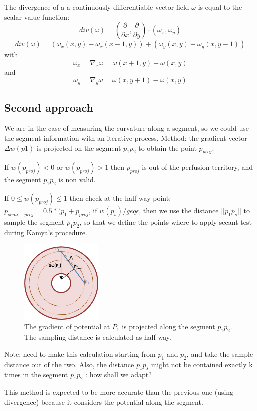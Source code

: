 \documentclass[11pt,a4paper]{article}
\begin{document}
The divergence of a a continuously differentiable vector field $\omega$ is equal to the scalar value function:
\begin{equation}
div (\omega) = (\frac{\partial}{\partial x}, \frac{\partial}{\partial y}) \cdot (\omega_x, \omega_y) 
\end{equation}
\begin{equation}
div (\omega) = \left( \omega_x(x, y) - \omega_x(x-1, y) \right) + \left( \omega_y(x, y) - \omega_y(x, y - 1) \right)
\end{equation}
with
\begin{equation}
\omega_x = \nabla_x \omega = \omega (x + 1, y) - \omega (x, y)
\end{equation}
and
\begin{equation}
\omega_y = \nabla_y \omega = \omega (x, y + 1) - \omega (x, y)
\end{equation}	

\subsection{Second approach}
We are in the case of measuring the curvature along a segment, so we could use the segment information with an iterative process.
Method: the gradient vector $\Delta w(p1)$ is projected on the segment $p_1p_2$ to obtain the point $p_{proj}$. 

If $w(p_{proj}) < 0$ or  $w(p_{proj}) > 1$ then $p_{proj}$ is out of the perfusion territory, and the segment $p_1p_2$ is non valid. 

If $0 \leq w(p_{proj}) \leq 1$ then check at the half way point: $p_{semi-proj} = 0.5 * (p_1 + p_{proj}$, if $w(p_{s}) /geq \epsilon$, then we use the distance $||p_1p_{s}||$ to sample the segment $p_1p_2$, so that we define the points where to apply secant test during Kamya's procedure.

\begin{figure}[h!]
\centering
\includegraphics[width=0.35\textwidth]{Drawings/ProjectionTest.png}
\caption{The gradient of potential at $P_1$ is projected along the segment $p_1p_2$. The sampling distance is calculated as half way.}
\label{projectiontest}
\end{figure}

Note: need to make this calculation starting from $p_1$ and $p_2$, and take the sample distance out of the two. Also, the distance $p_1p_s$ might not be contained exactly k times in the segment $p_1p_2$ : how shall we adapt? 

This method is expected to be more accurate than the previous one (using divergence) because it considers the potential along the segment.




	
\end{document}
